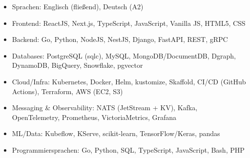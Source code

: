 \documentclass[10pt,a4paper]{resume}
\begin{document}
\begin{itemize}[leftmargin=1.4em,nosep,topsep=2pt]
  \item Sprachen: Englisch (fließend), Deutsch (A2)
  \item Frontend: ReactJS, Next.js, TypeScript, JavaScript, Vanilla JS, HTML5, CSS
  \item Backend: Go, Python, NodeJS, NestJS, Django, FastAPI, REST, gRPC
  \item Databases: PostgreSQL (sqlc), MySQL, MongoDB/DocumentDB, Dgraph, DynamoDB, BigQuery, Snowflake, pgvector
  \item Cloud/Infra: Kubernetes, Docker, Helm, kustomize, Skaffold, CI/CD (GitHub Actions), Terraform, AWS (EC2, S3)
  \item Messaging \& Observability: NATS (JetStream + KV), Kafka, OpenTelemetry, Prometheus, VictoriaMetrics, Grafana
  \item ML/Data: Kubeflow, KServe, scikit-learn, TensorFlow/Keras, pandas
  \item Programmiersprachen: Go, Python, SQL, TypeScript, JavaScript, Bash, PHP
\end{itemize}
\end{document}
